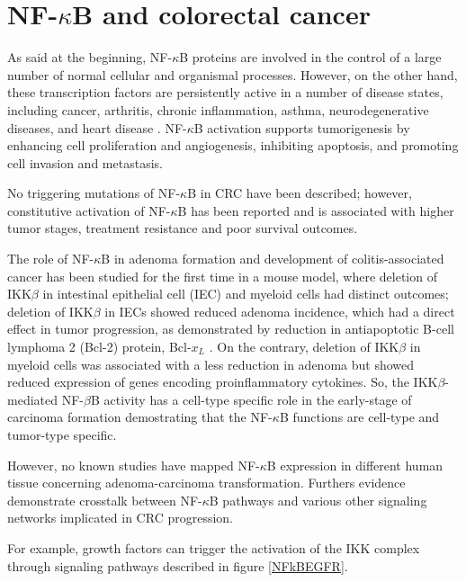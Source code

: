 \documentclass[12pt,a4paper]{report}
\begin{document}
\section{NF-\texorpdfstring{$\kappa$}{}B and colorectal cancer}

As said at the beginning, NF-$\kappa$B proteins are involved in the control of a large number of normal cellular and organismal processes. However, on the other hand, these transcription factors are persistently active in a number of disease states, including cancer, arthritis, chronic inflammation, asthma, neurodegenerative diseases, and heart disease \cite{NFkB}. NF-$\kappa$B activation supports tumorigenesis by enhancing cell proliferation and angiogenesis, inhibiting apoptosis, and promoting cell invasion and metastasis.

No triggering mutations of NF-$\kappa$B in CRC have been described; however, constitutive activation of NF-$\kappa$B has been reported and is associated with higher tumor stages, treatment resistance and poor survival outcomes.

The role of NF-$\kappa$B in adenoma formation and development of colitis-associated cancer has been studied for the first time in a mouse model, where deletion of IKK$\beta$ in intestinal epithelial cell (IEC) and myeloid cells had distinct outcomes; deletion of IKK$\beta$ in IECs showed reduced adenoma incidence, which had a direct effect in tumor progression, as demonstrated by reduction in antiapoptotic B-cell lymphoma
2 (Bcl-2) protein, Bcl-$x_{L}$ . On the contrary, deletion of IKK$\beta$ in myeloid cells was associated with a less reduction in adenoma but showed reduced expression of genes encoding proinflammatory cytokines. So, the IKK$\beta$-mediated NF-$\beta$B activity has a cell-type specific role in the early-stage of carcinoma formation demostrating that the NF-$\kappa$B functions are cell-type and tumor-type specific.

However, no known studies have mapped NF-$\kappa$B expression in different human tissue concerning adenoma-carcinoma transformation. Furthers evidence demonstrate crosstalk between NF-$\kappa$B pathways and various other signaling networks implicated in CRC progression.

For example, growth factors can trigger the activation of the IKK complex through signaling pathways described in figure \ref{NFkBEGFR}.
\end{document}
